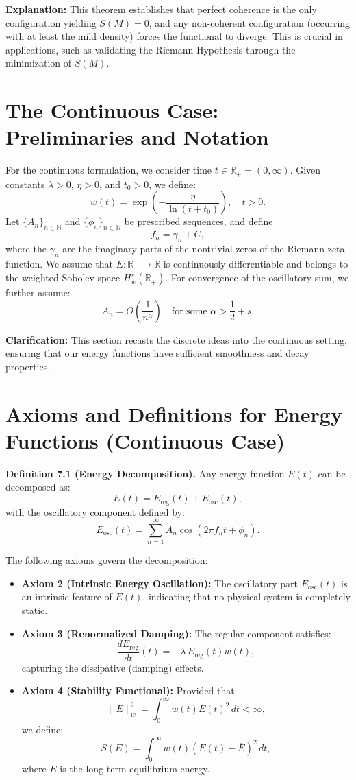 \documentclass[11pt]{article}
\begin{document}
\textbf{Explanation:} This theorem establishes that perfect coherence is the only configuration yielding $S(M)=0$, and any non-coherent configuration (occurring with at least the mild density) forces the functional to diverge. This is crucial in applications, such as validating the Riemann Hypothesis through the minimization of $S(M)$.

\section{The Continuous Case: Preliminaries and Notation}

For the continuous formulation, we consider time $t \in \mathbb{R}_{+}=(0,\infty)$. Given constants $\lambda>0$, $\eta>0$, and $t_0>0$, we define:
\[
w(t)=\exp\left(-\frac{\eta}{\ln(t+t_0)}\right), \quad t>0.
\]
Let $\{A_n\}_{n\in\mathbb{N}}$ and $\{\phi_n\}_{n\in\mathbb{N}}$ be prescribed sequences, and define
\[
f_n=\gamma_n+C,
\]
where the $\gamma_n$ are the imaginary parts of the nontrivial zeros of the Riemann zeta function. We assume that $E:\mathbb{R}_{+}\to\mathbb{R}$ is continuously differentiable and belongs to the weighted Sobolev space $H_w^s(\mathbb{R}_{+})$. For convergence of the oscillatory sum, we further assume:
\[
A_n=O\left(\frac{1}{n^{\alpha}}\right) \quad \text{for some } \alpha>\frac{1}{2}+s.
\]

\textbf{Clarification:} This section recasts the discrete ideas into the continuous setting, ensuring that our energy functions have sufficient smoothness and decay properties.

\section{Axioms and Definitions for Energy Functions (Continuous Case)}

\textbf{Definition 7.1 (Energy Decomposition).} Any energy function $E(t)$ can be decomposed as:
\[
E(t)=E_{\mathrm{reg}}(t)+E_{\mathrm{osc}}(t),
\]
with the oscillatory component defined by:
\[
E_{\mathrm{osc}}(t)=\sum_{n=1}^{\infty} A_n \cos\left(2\pi f_n t+\phi_n\right).
\]

The following axioms govern the decomposition:
\begin{itemize}
    \item \textbf{Axiom 2 (Intrinsic Energy Oscillation):} The oscillatory part $E_{\mathrm{osc}}(t)$ is an intrinsic feature of $E(t)$, indicating that no physical system is completely static.
    \item \textbf{Axiom 3 (Renormalized Damping):} The regular component satisfies:
    \[
    \frac{dE_{\mathrm{reg}}}{dt}(t)=-\lambda\,E_{\mathrm{reg}}(t)w(t),
    \]
    capturing the dissipative (damping) effects.
    \item \textbf{Axiom 4 (Stability Functional):} Provided that
    \[
    \|E\|_w^2=\int_0^\infty w(t)E(t)^2\,dt < \infty,
    \]
    we define:
    \[
    S(E)=\int_0^\infty w(t)\left(E(t)-\overline{E}\right)^2\,dt,
    \]
    where $\overline{E}$ is the long-term equilibrium energy.
\end{itemize}
\end{document}

